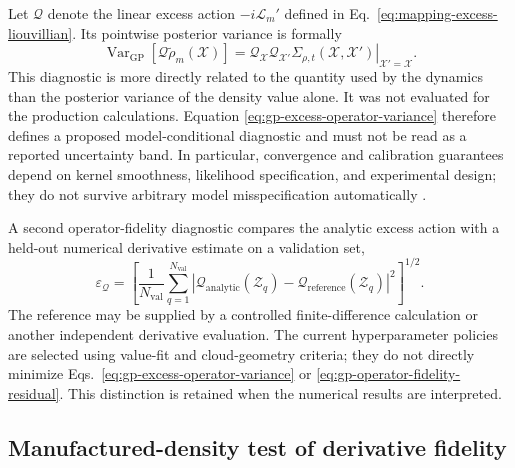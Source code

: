 \documentclass[
  11pt,
  letterpaper,
  onehalfspacing,
  normalmargins,
  equalmargins,
  oneside
]{ut-thesis}
\begin{document}
Let \(\mathcal Q\) denote the linear excess action
\(-i\mathcal L_m'\) defined in
Eq.~\eqref{eq:mapping-excess-liouvillian}. Its pointwise posterior variance is
formally
\begin{equation}
\operatorname{Var}_{\mathrm{GP}}
\left[
\mathcal Q\tilde\rho_m
(\boldsymbol{\mathcal X})
\right]
=
\left.
\mathcal Q_{\boldsymbol{\mathcal X}}
\mathcal Q_{\boldsymbol{\mathcal X}'}
\Sigma_{\rho,t}
\left(
\boldsymbol{\mathcal X},
\boldsymbol{\mathcal X}'
\right)
\right|_{
\boldsymbol{\mathcal X}'=
\boldsymbol{\mathcal X}
}.
\label{eq:gp-excess-operator-variance}
\end{equation}
This diagnostic is more directly related to the quantity used by the dynamics
than the posterior variance of the density value alone. It was not evaluated
for the production calculations. Equation
\eqref{eq:gp-excess-operator-variance} therefore defines a proposed
model-conditional diagnostic and must not be read as a reported uncertainty
band. In particular, convergence and calibration guarantees depend on kernel
smoothness, likelihood specification, and experimental design; they do not
survive arbitrary model misspecification automatically
\cite{WynneBriolGirolami2021,Teckentrup2020}.

A second operator-fidelity diagnostic compares the analytic excess action with
a held-out numerical derivative estimate on a validation set,
\begin{equation}
\varepsilon_{\mathcal Q}
=
\left[
\frac{1}{N_{\mathrm{val}}}
\sum_{q=1}^{N_{\mathrm{val}}}
\left|
\mathcal Q_{\mathrm{analytic}}(\boldsymbol{\mathcal Z}_q)
-
\mathcal Q_{\mathrm{reference}}(\boldsymbol{\mathcal Z}_q)
\right|^2
\right]^{1/2}.
\label{eq:gp-operator-fidelity-residual}
\end{equation}
The reference may be supplied by a controlled finite-difference calculation or
another independent derivative evaluation. The current hyperparameter policies
are selected using value-fit and cloud-geometry criteria; they do not directly
minimize Eqs.~\eqref{eq:gp-excess-operator-variance} or
\eqref{eq:gp-operator-fidelity-residual}. This distinction is retained when
the numerical results are interpreted.

\subsection{Manufactured-density test of derivative fidelity}
\label{subsec:gp-manufactured-operator-test}
\end{document}
